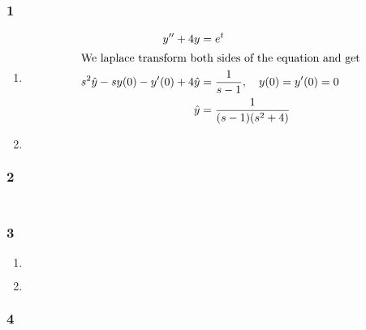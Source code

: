 \documentclass[a4paper]{article}
\newcommand{\ex}[1]{\subsubsection*{#1}}
\begin{document}
\pagestyle{fancy} %


\ex{1}

\begin{enumerate}[label=\alph*)]
    \item
        \begin{align}
          y'' + 4y &= e^t \\
          \intertext{We laplace transform both sides of the equation and get}
          s^2\hat y - sy(0) - y'(0) + 4 \hat y &= \frac{1}{s-1}, \quad y(0) = y'(0) = 0\\
          \hat y &= \frac{1}{(s-1)(s^2 + 4)}\\
        \end{align}

    \item
        \begin{align}
        \end{align}
\end{enumerate}

\ex{2}

\begin{align}
\end{align}

\ex{3}

\begin{enumerate}[label=\alph*)]
    \item 
        \begin{align}
        \end{align}

    \item
        \begin{align}
        \end{align}
\end{enumerate}


\ex{4}

\begin{align}
\end{align}


%
\end{document}
